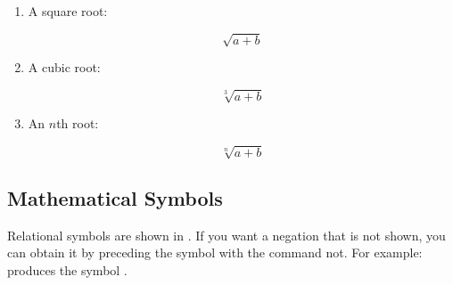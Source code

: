 \begin{enumerate}
\item A square root:
\begin{codeS}
  
\end{codeS}%
\begin{resultS}
\[
\sqrt{a+b}
\]
\end{resultS}

\item A cubic root:
\begin{codeS}
  
\end{codeS}%
\begin{resultS}
\[
\sqrt[3]{a+b}
\]
\end{resultS}

\item An \ensuremath{n}th root:
\begin{codeS}
  
\end{codeS}%
\begin{resultS}
\[
\sqrt[n]{a+b}
\]
\end{resultS}
\end{enumerate}


\subsection{Mathematical Symbols}
\label{sec:mathssym}

Relational symbols are shown in .  If you want a
negation that is not shown, you can obtain it by preceding the
symbol with the command \gls{not}.  For example:
 produces the symbol 
.


